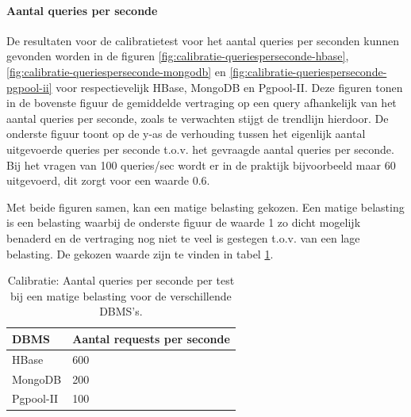 \paragraph{Aantal queries per seconde}
De resultaten voor de calibratietest voor het aantal queries per seconden kunnen gevonden worden in de figuren \ref{fig:calibratie-queriesperseconde-hbase}, \ref{fig:calibratie-queriesperseconde-mongodb} en \ref{fig:calibratie-queriesperseconde-pgpool-ii} voor respectievelijk HBase, MongoDB en Pgpool-II. Deze figuren tonen in de bovenste figuur de gemiddelde vertraging op een query afhankelijk van het aantal queries per seconde, zoals te verwachten stijgt de trendlijn hierdoor. De onderste figuur toont op de y-as de verhouding tussen het eigenlijk aantal uitgevoerde queries per seconde t.o.v. het gevraagde aantal queries per seconde. Bij het vragen van 100 queries/sec wordt er in de praktijk bijvoorbeeld maar 60 uitgevoerd, dit zorgt voor een waarde $0.6$. 

Met beide figuren samen, kan een matige belasting gekozen. Een matige belasting is een belasting waarbij de onderste figuur de waarde 1 zo dicht mogelijk benaderd en de vertraging nog niet te veel is gestegen t.o.v. van een lage belasting. De gekozen waarde zijn te vinden in tabel \ref{table:calibratie-queriesperseconde-resultaat}. 

\begin{table}[h!]
	\centering
	\begin{tabular}{l| l }
		\textbf{DBMS} & Aantal requests per seconde \\
		\hline
		HBase & 600 \\
		MongoDB & 200\\
		Pgpool-II & 100\\
	\end{tabular}
	\caption{Calibratie: Aantal queries per seconde per test bij een matige belasting voor de verschillende DBMS's.}
	\label{table:calibratie-queriesperseconde-resultaat}
\end{table}

